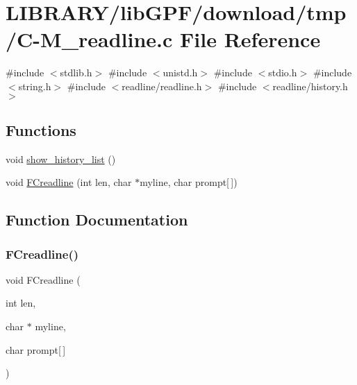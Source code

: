 \hypertarget{C-M__readline_8c}{}\section{L\+I\+B\+R\+A\+R\+Y/lib\+G\+P\+F/download/tmp/\+C-\/\+M\+\_\+readline.c File Reference}
\label{C-M__readline_8c}
{\ttfamily \#include $<$stdlib.\+h$>$}\newline
{\ttfamily \#include $<$unistd.\+h$>$}\newline
{\ttfamily \#include $<$stdio.\+h$>$}\newline
{\ttfamily \#include $<$string.\+h$>$}\newline
{\ttfamily \#include $<$readline/readline.\+h$>$}\newline
{\ttfamily \#include $<$readline/history.\+h$>$}\newline
\subsection*{Functions}
\begin{DoxyCompactItemize}
\item 
void \hyperlink{C-M__readline_8c_a80269900528c2ee04bf7cacb3a07ff40}{show\+\_\+history\+\_\+list} ()
\item 
void \hyperlink{C-M__readline_8c_a146edc06a54e833494378446131c6bcd}{F\+Creadline} (int len, char $\ast$myline, char prompt\mbox{[}$\,$\mbox{]})
\end{DoxyCompactItemize}


\subsection{Function Documentation}
\mbox{\label{C-M__readline_8c_a146edc06a54e833494378446131c6bcd}} 
\subsubsection{\texorpdfstring{F\+Creadline()}{FCreadline()}}
{\footnotesize\ttfamily void F\+Creadline (\begin{DoxyParamCaption}\item[{int}]{len,  }\item[{char $\ast$}]{myline,  }\item[{char}]{prompt\mbox{[}$\,$\mbox{]} }\end{DoxyParamCaption})}



